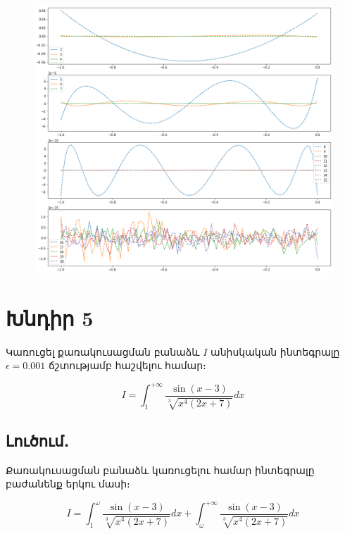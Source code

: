 \documentclass{article}
\begin{document}
\begin{figure}[h]
   \includegraphics[width=\textwidth]{lagrange_optimal_nodes}
\end{figure}



\newpage

\section*{Խնդիր 5}

Կառուցել քառակուսացման բանաձև $I$ անիսկական ինտեգրալը $\epsilon = 0.001$ ճշտությամբ հաշվելու համար։

						$$I = \int_{1}^{+\infty}\dfrac{\sin\left(x - 3\right)}{\sqrt[3]{x^{4}\left(2x+7\right)}}dx$$


\subsection*{Լուծում․}

Քառակուսացման բանաձև կառուցելու համար ինտեգրալը բաժանենք երկու մասի։


\begin{equation} \label{eq}
				I = \int_{1}^{\omega}\dfrac{\sin\left(x - 3\right)}{\sqrt[3]{x^{4}\left(2x+7\right)}}dx + \int_{\omega}^{+\infty}\dfrac{\sin\left(x - 3\right)}{\sqrt[3]{x^{4}\left(2x+7\right)}}dx
\end{equation}
\end{document}
